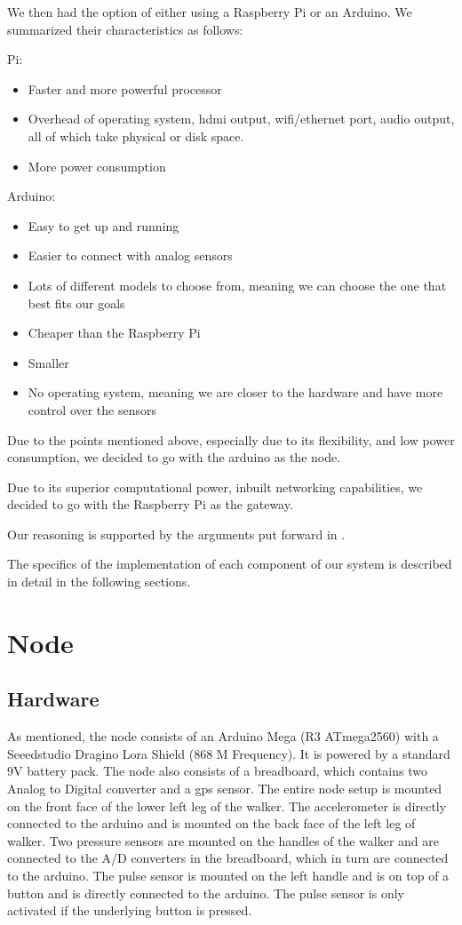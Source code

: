 		We then had the option of either using a Raspberry Pi or an Arduino. We summarized their characteristics as follows:

		Pi:
		\begin{itemize}
			\item Faster and more powerful processor
			\item Overhead of operating system, hdmi output, wifi/ethernet port, audio output, all of which take physical or disk space.
			\item More power consumption
		\end{itemize}

		Arduino:
		\begin{itemize}
			\item Easy to get up and running
			\item Easier to connect with analog sensors
			\item Lots of different models to choose from, meaning we can choose the one that best fits our goals
			\item Cheaper than the Raspberry Pi
			\item Smaller 
			\item No operating system, meaning we are closer to the hardware and have more control over the sensors
		\end{itemize}

		Due to the points mentioned above, especially due to its flexibility, and low power consumption, we decided to go with the arduino as the node.

		Due to its superior computational power, inbuilt networking capabilities, we decided to go with the Raspberry Pi as the gateway.

		Our reasoning is supported by the arguments put forward in \cite{postolache2011smart}.





The specifics of the implementation of each component of our system is described in detail in the following sections.


\section{Node} 
	\subsection{Hardware}
		As mentioned, the node consists of an Arduino Mega (R3 ATmega2560) with a Seeedstudio Dragino Lora Shield (868 M Frequency). It is powered by a standard 9V battery pack. The node also consists of a breadboard, which contains two Analog to Digital converter and a gps sensor. The entire node setup is mounted on the front face of the lower left leg of the walker. The accelerometer is directly connected to the arduino and is mounted on the back face of the left leg of walker. Two pressure sensors are mounted on the handles of the walker and are connected to the A/D converters in the breadboard, which in turn are connected to the arduino. The pulse sensor is mounted on the left handle and is on top of a button and is directly connected to the arduino. The pulse sensor is only activated if the underlying button is pressed. 

